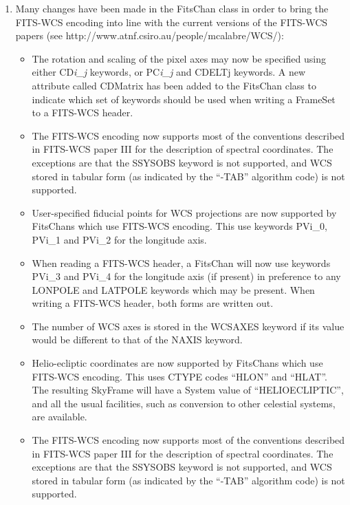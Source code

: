\documentclass[twoside,11pt]{article}
\newcommand{\htmladdnormallink}[2]{#1}
\begin{document}
\begin{enumerate}

\item Many changes have been made in the FitsChan class in order to bring
the FITS-WCS encoding into line with the current versions of the FITS-WCS
papers (see \htmladdnormallink{http://www.atnf.csiro.au/people/mcalabre/WCS/}
{http://www.atnf.csiro.au/people/mcalabre/WCS/}):

\begin{itemize}

\item The rotation and scaling of the pixel axes may now be specified using
either CD\emph{i\_j} keywords, or PC\emph{i\_j} and CDELTj keywords. A new attribute
called CDMatrix has been added to the FitsChan class to indicate which
set of keywords should be used when writing a FrameSet to a FITS-WCS
header.

\item The FITS-WCS encoding now supports most of the conventions
described in FITS-WCS paper III for the description of spectral
coordinates. The exceptions are that the SSYSOBS keyword is not
supported, and WCS stored in tabular form (as indicated by the ``-TAB''
algorithm code) is not supported.


\item User-specified fiducial points for WCS projections are now
supported by FitsChans which use FITS-WCS encoding. This use keywords
PVi\_0, PVi\_1 and PVi\_2 for the longitude axis.

\item  When reading a FITS-WCS header, a FitsChan will now use keywords PVi\_3
and PVi\_4 for the longitude axis (if present) in preference to any LONPOLE
and LATPOLE keywords which may be present. When writing a FITS-WCS header,
both forms are written out.

\item The number of WCS axes is stored in the WCSAXES keyword if its value
would be different to that of the NAXIS keyword.

\item Helio-ecliptic coordinates are now supported by FitsChans which use
FITS-WCS encoding. This uses CTYPE codes ``HLON'' and ``HLAT''. The
resulting SkyFrame will have a System value of ``HELIOECLIPTIC'', and all
the usual facilities, such as conversion to other celestial systems, are
available.

\item The FITS-WCS encoding now supports most of the conventions
described in FITS-WCS paper III for the description of spectral
coordinates. The exceptions are that the SSYSOBS keyword is not
supported, and WCS stored in tabular form (as indicated by the ``-TAB''
algorithm code) is not supported.


\end{itemize}
\end{enumerate}
\end{document}
